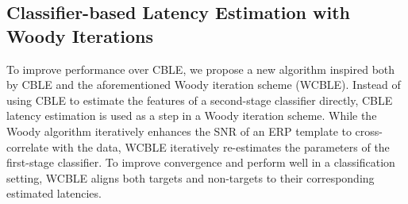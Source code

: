 \subsection{Classifier-based Latency Estimation with Woody
	Iterations}
To improve performance over CBLE, we propose a new algorithm inspired both by
CBLE and the aforementioned Woody iteration scheme (WCBLE).
Instead of using CBLE to estimate the features of a second-stage classifier
directly, CBLE latency estimation is used as a step in a Woody iteration scheme.
While the Woody algorithm iteratively enhances the SNR of an ERP template to
cross-correlate with the data, WCBLE iteratively re-estimates the parameters of
the first-stage classifier.
To improve convergence and perform well in a classification setting, WCBLE
aligns both targets and non-targets to their corresponding estimated latencies.

